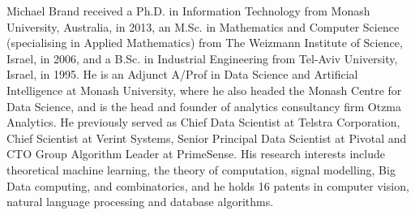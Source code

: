 \documentclass{IEEEtran}
\begin{document}
\begin{IEEEbiographynophoto}{Michael Brand}
received a Ph.D. in Information Technology from Monash University, Australia,
in 2013, an M.Sc. in Mathematics and Computer Science (specialising in
Applied Mathematics) from The Weizmann Institute of Science,
Israel, in 2006, and a B.Sc. in Industrial Engineering from
Tel-Aviv University, Israel, in 1995. He is an Adjunct A/Prof in Data Science
and Artificial Intelligence at Monash University, where he also headed the
Monash Centre for Data Science, and is the head and founder
of analytics consultancy firm Otzma Analytics. He previously served as
Chief Data Scientist at Telstra Corporation, Chief Scientist at Verint
Systems, Senior Principal Data Scientist at Pivotal and CTO Group
Algorithm Leader at PrimeSense.
His research interests include theoretical machine learning,
the theory of computation, signal modelling, Big Data computing, and
combinatorics, and he holds 16 patents in computer vision,
natural language processing and database algorithms.
\end{IEEEbiographynophoto}
\end{document}
